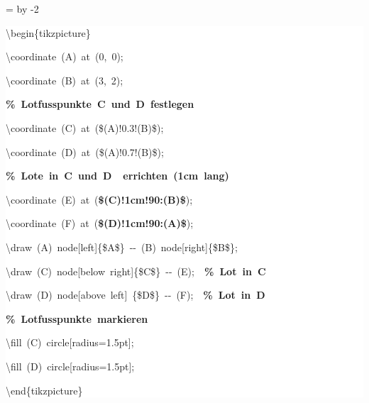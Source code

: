 \begingroup
\ttfamily
{}
=\textwidth
\advance{} by -2\fboxsep
\noindent
\colorbox{background}
{%
\parbox{\dimen255}
{%
\rule[-0.5ex]{0pt}{2.5ex}\hspace*{0.0em}\textbackslash{}begin\{tikzpicture\}\\
\rule[-0.5ex]{0pt}{2.5ex}\hspace*{1.0em}\textbackslash{}coordinate~(A)~at~(0,~0);\\
\rule[-0.5ex]{0pt}{2.5ex}\hspace*{1.0em}\textbackslash{}coordinate~(B)~at~(3,~2);\\
\rule[-0.5ex]{0pt}{2.5ex}\hspace*{1.0em}\textcolor{G}{\textbf{\%~Lotfusspunkte~C~und~D~festlegen}}\\
\rule[-0.5ex]{0pt}{2.5ex}\hspace*{1.0em}\textbackslash{}coordinate~(C)~at~(\$(A)!0.3!(B)\$);\\
\rule[-0.5ex]{0pt}{2.5ex}\hspace*{1.0em}\textbackslash{}coordinate~(D)~at~(\$(A)!0.7!(B)\$);\\
\rule[-0.5ex]{0pt}{2.5ex}\hspace*{1.0em}\textcolor{G}{\textbf{\%~Lote~in~C~und~D~~errichten~(1cm~lang)}}\\
\rule[-0.5ex]{0pt}{2.5ex}\hspace*{1.0em}\textbackslash{}coordinate~(E)~at~(\textcolor{R}{\textbf{\$(C)!1cm!90:(B)\$}});\\
\rule[-0.5ex]{0pt}{2.5ex}\hspace*{1.0em}\textbackslash{}coordinate~(F)~at~(\textcolor{R}{\textbf{\$(D)!1cm!90:(A)\$}});\\
\rule[-0.5ex]{0pt}{2.5ex}\hspace*{1.0em}\textbackslash{}draw~(A)~node[left]\{\$A\$\}~{-}{-}~(B)~node[right]\{\$B\$\};\\
\rule[-0.5ex]{0pt}{2.5ex}\hspace*{1.0em}\textbackslash{}draw~(C)~node[below~right]\{\$C\$\}~{-}{-}~(E);~~\textcolor{G}{\textbf{\%~Lot~in~C}}\\
\rule[-0.5ex]{0pt}{2.5ex}\hspace*{1.0em}\textbackslash{}draw~(D)~node[above~left]~\{\$D\$\}~{-}{-}~(F);~~\textcolor{G}{\textbf{\%~Lot~in~D}}\\
\rule[-0.5ex]{0pt}{2.5ex}\hspace*{1.0em}\textcolor{G}{\textbf{\%~Lotfusspunkte~markieren}}\\
\rule[-0.5ex]{0pt}{2.5ex}\hspace*{1.0em}\textbackslash{}fill~(C)~circle[radius=1.5pt];\\
\rule[-0.5ex]{0pt}{2.5ex}\hspace*{1.0em}\textbackslash{}fill~(D)~circle[radius=1.5pt];\\
\rule[-0.5ex]{0pt}{2.5ex}\hspace*{0.0em}\textbackslash{}end\{tikzpicture\}}%
}%
\endgroup
